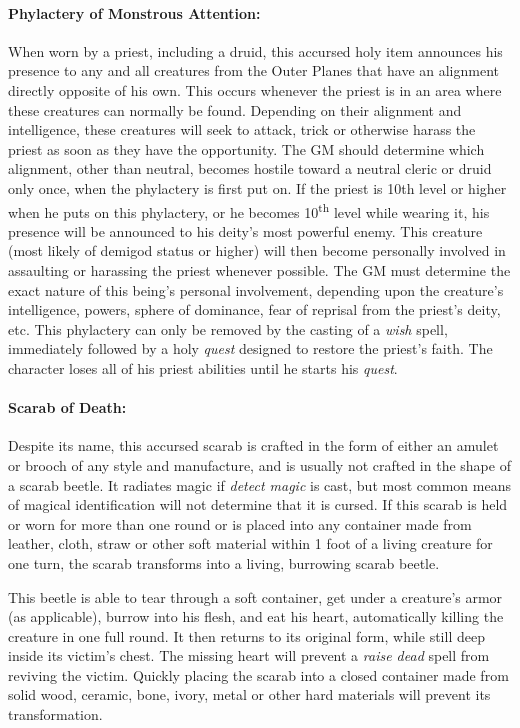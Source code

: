 \begin{multicols}{2}
\paragraph{Phylactery of Monstrous Attention:} When worn by a priest, including a druid, this accursed holy item announces his presence to any and all creatures from the Outer Planes that have an alignment directly opposite of his own.  This occurs whenever the priest is in an area where these creatures can normally be found.  Depending on their alignment and intelligence, these creatures will seek to attack, trick or otherwise harass the priest as soon as they have the opportunity.  The GM should determine which alignment, other than neutral, becomes hostile toward a neutral cleric or druid only once, when the phylactery is first put on.  If the priest is 10th level or higher when he puts on this phylactery, or he becomes 10\textsuperscript{th} level while wearing it, his presence will be announced to his deity's most powerful enemy.  This creature (most likely of demigod status or higher) will then become personally involved in assaulting or harassing the priest whenever possible.  The GM must determine the exact nature of this being's personal involvement, depending upon the creature's intelligence, powers, sphere of dominance, fear of reprisal from the priest's deity, etc.  This phylactery can only be removed by the casting of a \textit{wish} spell, immediately followed by a holy \textit{quest} designed to restore the priest's faith.  The character loses all of his priest abilities until he starts his \textit{quest}.
 
\paragraph{Scarab of Death:} Despite its name, this accursed scarab is crafted in the form of either an amulet or brooch of any style and manufacture, and is usually not crafted in the shape of a scarab beetle.  It radiates magic if \textit{detect magic} is cast, but most common means of magical identification will not determine that it is cursed.  If this scarab is held or worn for more than one round or is placed into any container made from leather, cloth, straw or other soft material within 1 foot of a living creature for one turn, the scarab transforms into a living, burrowing scarab beetle.

This beetle is able to tear through a soft container, get under a creature's armor (as applicable), burrow into his flesh, and eat his heart, automatically killing the creature in one full round.  It then returns to its original form, while still deep inside its victim's chest.  The missing heart will prevent a \textit{raise dead} spell from reviving the victim.  Quickly placing the scarab into a closed container made from solid wood, ceramic, bone, ivory, metal or other hard materials will prevent its transformation.


\end{multicols}
